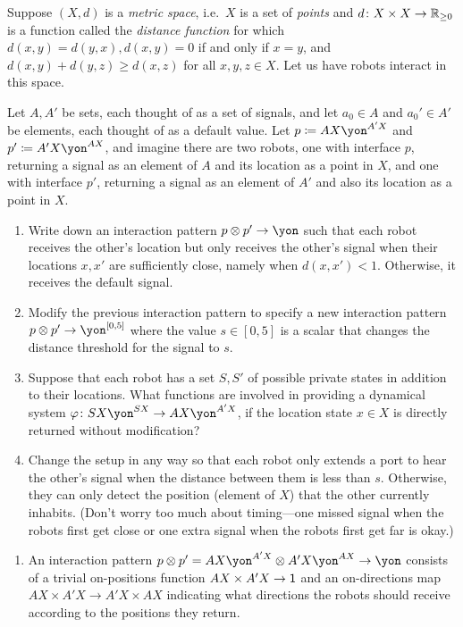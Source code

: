 \documentclass[Book-Poly]{subfiles}
\begin{document}
\begin{exercise}
Suppose $(X,d)$ is a \emph{metric space}, i.e.\ $X$ is a set of \emph{points} and $d\colon X\times X\to\mathbb{R}_{\geq0}$ is a function called the \emph{distance function} for which $d(x,y)=d(y,x),d(x,y)=0$ if and only if $x=y$, and $d(x,y)+d(y,z)\geq d(x,z)$ for all $x,y,z\in X$.
Let us have robots interact in this space.

Let $A,A'$ be sets, each thought of as a set of signals, and let $a_0\in A$ and $a_0'\in A'$ be elements, each thought of as a default value. Let $p\coloneqq AX\yon^{A'X}$ and $p'\coloneqq A'X\yon^{AX}$, and imagine there are two robots, one with interface $p$, returning a signal as an element of $A$ and its location as a point in $X$, and one with interface $p'$, returning a signal as an element of $A'$ and also its location as a point in $X$.
\begin{enumerate}
	\item Write down an interaction pattern $p\otimes p'\to\yon$ such that each robot receives the other's location but only receives the other's signal when their locations $x,x'$ are sufficiently close, namely when $d(x,x')<1$.
	Otherwise, it receives the default signal.
	\item Modify the previous interaction pattern to specify a new interaction pattern $p\otimes p'\to\yon^{[0,5]}$ where the value $s\in [0,5]$ is a scalar that changes the distance threshold for the signal to $s$.
	\item Suppose that each robot has a set $S,S'$ of possible private states in addition to their locations.
	What functions are involved in providing a dynamical system $\varphi\colon SX\yon^{SX}\to AX\yon^{A'X}$, if the location state $x\in X$ is directly returned without modification?
	\item Change the setup in any way so that each robot only extends a port to hear the other's signal when the distance between them is less than $s$. Otherwise, they can only detect the position (element of $X$) that the other currently inhabits.
	(Don't worry too much about timing---one missed signal when the robots first get close or one extra signal when the robots first get far is okay.)
\qedhere
\end{enumerate}
\begin{solution}
\begin{enumerate}
    \item An interaction pattern $p\otimes p'=AX\yon^{A'X}\otimes A'X\yon^{AX}\to\yon$ consists of a trivial on-positions function $AX\times A'X\to\textsf{1}$ and an on-directions map $AX\times A'X\to A'X\times AX$ indicating what directions the robots should receive according to the positions they return.

\end{enumerate}
\end{solution}
\end{exercise}
\end{document}
